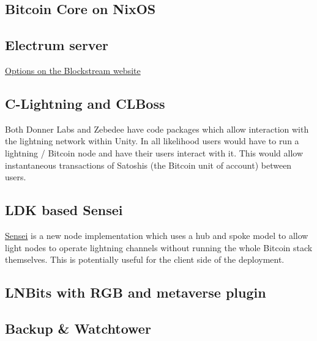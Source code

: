 \subsection{Bitcoin Core on NixOS}
\subsection{Electrum server}
\href{https://blog.blockstream.com/en-esplora-and-other-alternatives-to-electrumx/}{Options on the Blockstream website}
\subsection{C-Lightning and CLBoss}
Both Donner Labs and Zebedee have code packages which allow interaction with the lightning network within Unity. In all likelihood users would have to run a lightning / Bitcoin node and have their users interact with it. This would allow instantaneous transactions of Satoshis (the Bitcoin unit of account) between users. 
\subsection{LDK based Sensei}
\href{https://l2.technology/sensei}{Sensei} is a new node implementation which uses a hub and spoke model to allow light nodes to operate lightning channels without running the whole Bitcoin stack themselves. This is potentially useful for the client side of the deployment.

\subsection{LNBits with RGB and metaverse plugin}
\subsection{Backup \& Watchtower}
